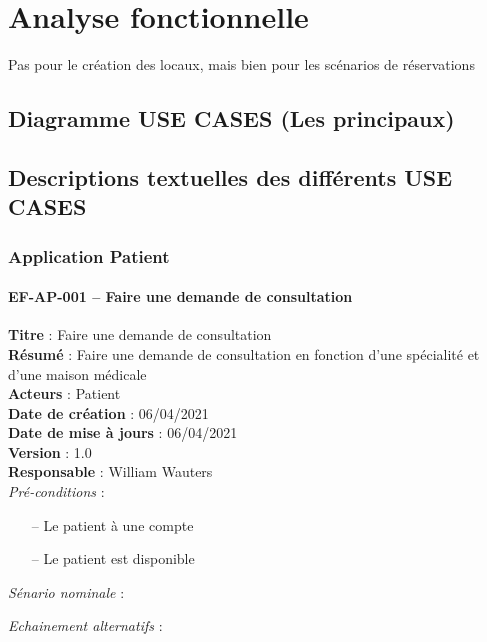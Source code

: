 \documentclass[a4paper,11pt]{article}
\begin{document}
	\newpage
	
	\section{Analyse fonctionnelle}
	
	Pas pour le création des locaux, mais bien pour les scénarios de réservations 
		
	\subsection{Diagramme USE CASES (Les principaux)}

	\subsection{Descriptions textuelles des différents USE CASES}

	\subsubsection{Application Patient}

	\paragraph{EF-AP-001 -- Faire une demande de consultation}
	
	\textbf{Titre} : Faire une demande de consultation\\
	\textbf{Résumé} : Faire une demande de consultation en fonction d'une spécialité et d'une maison médicale\\
	\textbf{Acteurs} : Patient\\
	\textbf{Date de création} : 06/04/2021\\
	\textbf{Date de mise à jours} : 06/04/2021\\
	\textbf{Version} : 1.0\\
	\textbf{Responsable} : William Wauters\\
	
	\textit{Pré-conditions} :
	\begin{itemize}
		\setlength\itemsep{-0.7em}
		\item[--] Le patient à une compte
		\item[--] Le patient est disponible
	\end{itemize}
	
	\textit{Sénario nominale} :
	
	\textit{Echainement alternatifs} :
	
\end{document}
